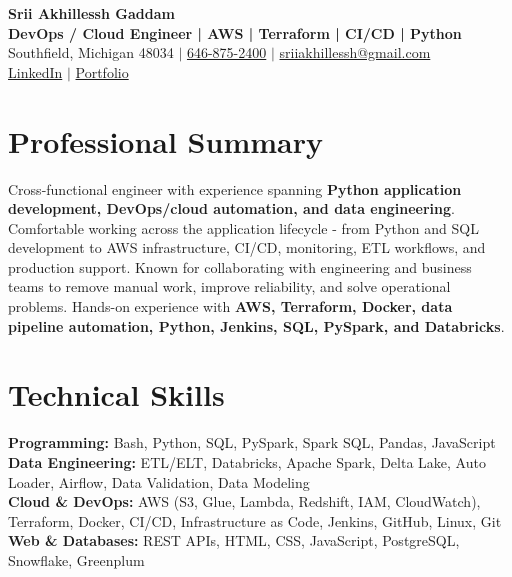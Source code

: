 \documentclass[letterpaper,10pt]{article}
\begin{document}
\fontsize{9.35pt}{10.45pt}\selectfont

\begin{center}
    {\LARGE \textbf{Srii Akhillessh Gaddam}} \\[-1pt]
    \textbf{DevOps / Cloud Engineer | AWS | Terraform | CI/CD | Python} \\[2pt]
    Southfield, Michigan 48034 $|$
    \href{tel:6468752400}{646-875-2400} $|$
    \href{mailto:sriiakhillessh@gmail.com}{sriiakhillessh@gmail.com} \\[1pt]
    \href{https://www.linkedin.com/in/srii-akhiilessh-gaddam-b48668191/}{LinkedIn} $|$
    \href{https://sriiakhillesshg.github.io/portfolio/}{Portfolio}
\end{center}
\vspace{-8pt}

\section{Professional Summary}
\small{Cross-functional engineer with experience spanning \textbf{Python application development, DevOps/cloud automation, and data engineering}. Comfortable working across the application lifecycle - from Python and SQL development to AWS infrastructure, CI/CD, monitoring, ETL workflows, and production support. Known for collaborating with engineering and business teams to remove manual work, improve reliability, and solve operational problems. Hands-on experience with \textbf{AWS, Terraform, Docker, data pipeline automation, Python, Jenkins, SQL, PySpark, and Databricks}.}

\section{Technical Skills}
\small{
\textbf{Programming:} Bash, Python, SQL, PySpark, Spark SQL, Pandas, JavaScript \\
\textbf{Data Engineering:} ETL/ELT, Databricks, Apache Spark, Delta Lake, Auto Loader, Airflow, Data Validation, Data Modeling \\
\textbf{Cloud \& DevOps:} AWS (S3, Glue, Lambda, Redshift, IAM, CloudWatch), Terraform, Docker, CI/CD, Infrastructure as Code, Jenkins, GitHub, Linux, Git \\
\textbf{Web \& Databases:} REST APIs, HTML, CSS, JavaScript, PostgreSQL, Snowflake, Greenplum
}
\end{document}
